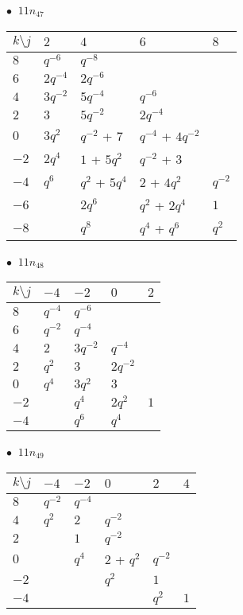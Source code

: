 \begin{minipage}{\linewidth}
$\bullet\ $ $11n_{47}$ \vspace{0.5em} \\
\begin{tabular}{l|llll}
$k \setminus j$ & $2$ & $4$ & $6$ & $8$ \\
\hline
$8$ & $q^{-6}$ & $q^{-8}$ &  &  \\
$6$ & $2q^{-4}$ & $2q^{-6}$ &  &  \\
$4$ & $3q^{-2}$ & $5q^{-4}$ & $q^{-6}$ &  \\
$2$ & $3$ & $5q^{-2}$ & $2q^{-4}$ &  \\
$0$ & $3q^{2}$ & $q^{-2}$ + $7$ & $q^{-4}$ + $4q^{-2}$ &  \\
$-2$ & $2q^{4}$ & $1$ + $5q^{2}$ & $q^{-2}$ + $3$ &  \\
$-4$ & $q^{6}$ & $q^{2}$ + $5q^{4}$ & $2$ + $4q^{2}$ & $q^{-2}$ \\
$-6$ &  & $2q^{6}$ & $q^{2}$ + $2q^{4}$ & $1$ \\
$-8$ &  & $q^{8}$ & $q^{4}$ + $q^{6}$ & $q^{2}$ \\
\end{tabular}
\vspace{2em}
\end{minipage}
%
\begin{minipage}{\linewidth}
$\bullet\ $ $11n_{48}$ \vspace{0.5em} \\
\begin{tabular}{l|llll}
$k \setminus j$ & $-4$ & $-2$ & $0$ & $2$ \\
\hline
$8$ & $q^{-4}$ & $q^{-6}$ &  &  \\
$6$ & $q^{-2}$ & $q^{-4}$ &  &  \\
$4$ & $2$ & $3q^{-2}$ & $q^{-4}$ &  \\
$2$ & $q^{2}$ & $3$ & $2q^{-2}$ &  \\
$0$ & $q^{4}$ & $3q^{2}$ & $3$ &  \\
$-2$ &  & $q^{4}$ & $2q^{2}$ & $1$ \\
$-4$ &  & $q^{6}$ & $q^{4}$ &  \\
\end{tabular}
\vspace{2em}
\end{minipage}
%
\begin{minipage}{\linewidth}
$\bullet\ $ $11n_{49}$ \vspace{0.5em} \\
\begin{tabular}{l|lllll}
$k \setminus j$ & $-4$ & $-2$ & $0$ & $2$ & $4$ \\
\hline
$8$ & $q^{-2}$ & $q^{-4}$ &  &  &  \\
$4$ & $q^{2}$ & $2$ & $q^{-2}$ &  &  \\
$2$ &  & $1$ & $q^{-2}$ &  &  \\
$0$ &  & $q^{4}$ & $2$ + $q^{2}$ & $q^{-2}$ &  \\
$-2$ &  &  & $q^{2}$ & $1$ &  \\
$-4$ &  &  &  & $q^{2}$ & $1$ \\
\end{tabular}
\vspace{2em}
\end{minipage}
